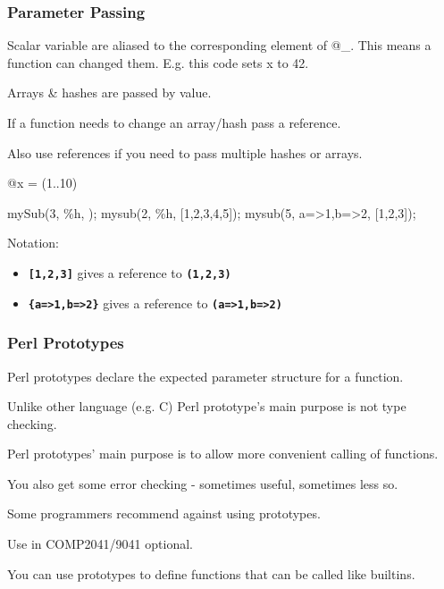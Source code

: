 \begin{frame}
\frametitle{Parameter Passing}
Scalar variable are aliased to the corresponding element of @\_.
This means a function can changed them. E.g. this code sets x to 42.

Arrays \& hashes are passed by value.

If a function needs to change an
array/hash pass a reference.

Also use references if you need to pass multiple hashes or arrays.

\begin{perl}
    @x = (1..10)
    
    mySub(3, \%h, \@x);
    mysub(2, \%h, [1,2,3,4,5]);
    mysub(5, {a=>1,b=>2}, [1,2,3]);
\end{perl}


Notation:
\begin{itemize}
\item  \textbf{\tt{[1,2,3]}} gives a reference to \textbf{\tt{(1,2,3)}}
\item  \textbf{\tt{\{a=>1,b=>2\}}} gives a reference to \textbf{\tt{(a=>1,b=>2)}}
\end{itemize}
\end{frame}

\begin{frame}
\frametitle{Perl Prototypes}
Perl prototypes declare the expected parameter structure
for a function.

Unlike other language (e.g. C) Perl prototype's main purpose
is not type checking.

Perl prototypes' main purpose is to allow more convenient calling of  functions.

You also get some error checking - sometimes useful, sometimes less so.

Some programmers recommend against using prototypes.

Use in COMP2041/9041 optional.

You can use prototypes to define functions that can be called like builtins.
\end{frame}


